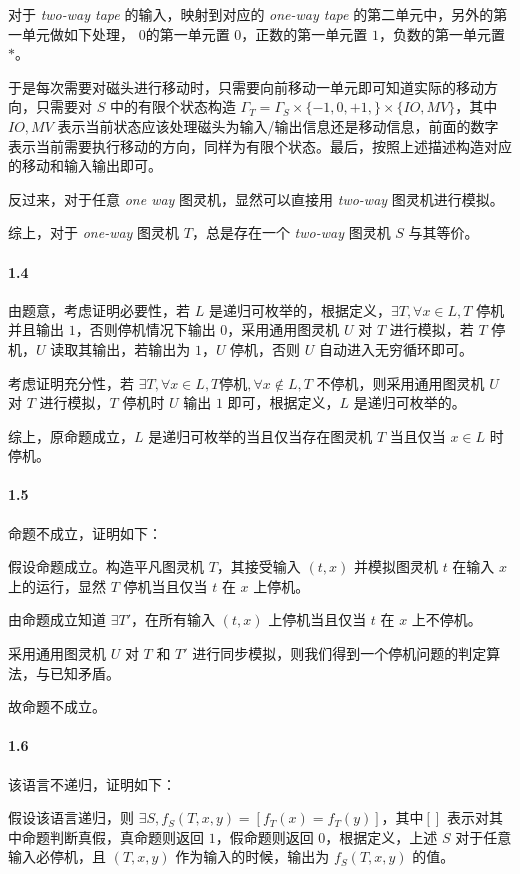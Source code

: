 \documentclass[12pt, a4paper, oneside]{ctexart}
\begin{document}
	对于 \textit{two-way tape} 的输入，映射到对应的 \textit{one-way tape} 的第二单元中，另外的第一单元做如下处理， $0$的第一单元置 $0$，正数的第一单元置 $1$，负数的第一单元置 $*$。
	
	于是每次需要对磁头进行移动时，只需要向前移动一单元即可知道实际的移动方向，只需要对 $S$ 中的有限个状态构造 $\Gamma_T=\Gamma_S\times\{-1,0,+1,\}\times\{IO,MV\}$，其中 $IO,MV$ 表示当前状态应该处理磁头为输入/输出信息还是移动信息，前面的数字表示当前需要执行移动的方向，同样为有限个状态。最后，按照上述描述构造对应的移动和输入输出即可。
	
	反过来，对于任意 \textit{one way} 图灵机，显然可以直接用 \textit{two-way} 图灵机进行模拟。
	
	综上，对于 \textit{one-way} 图灵机 $T$，总是存在一个 \textit{two-way} 图灵机 $S$ 与其等价。
	\paragraph{1.4}
	由题意，考虑证明必要性，若 $L$ 是递归可枚举的，根据定义，$\exists T,\forall x\in L, T$ 停机并且输出 $1$，否则停机情况下输出 $0$，采用通用图灵机 $U$ 对 $T$ 进行模拟，若 $T$ 停机，$U$ 读取其输出，若输出为 $1$，$U$ 停机，否则 $U$ 自动进入无穷循环即可。
	
	考虑证明充分性，若 $\exists T,\forall x\in L, T $停机$, \forall x\notin L, T$ 不停机，则采用通用图灵机 $U$ 对 $T$ 进行模拟，$T$ 停机时 $U$ 输出 $1$ 即可，根据定义，$L$ 是递归可枚举的。
	
	综上，原命题成立，$L$ 是递归可枚举的当且仅当存在图灵机 $T$ 当且仅当 $x\in L$ 时停机。
	\paragraph{1.5}
	命题不成立，证明如下：
	
	假设命题成立。构造平凡图灵机 $T$，其接受输入 $(t,x)$ 并模拟图灵机 $t$ 在输入 $x$ 上的运行，显然 $T$ 停机当且仅当 $t$ 在 $x$ 上停机。
	
	由命题成立知道 $\exists T'$，在所有输入 $(t,x)$ 上停机当且仅当 $t$ 在 $x$ 上不停机。
	
	采用通用图灵机 $U$ 对 $T$ 和 $T'$ 进行同步模拟，则我们得到一个停机问题的判定算法，与已知矛盾。
	
	故命题不成立。
	
	\paragraph{1.6}
	该语言不递归，证明如下：
	
	假设该语言递归，则 $\exists S, f_S(T,x,y) = [f_T(x)=f_T(y)]$，其中$[]$ 表示对其中命题判断真假，真命题则返回 $1$，假命题则返回 $0$，根据定义，上述 $S$ 对于任意输入必停机，且 $(T,x,y)$ 作为输入的时候，输出为 $f_S(T,x,y)$ 的值。
	
\end{document}
